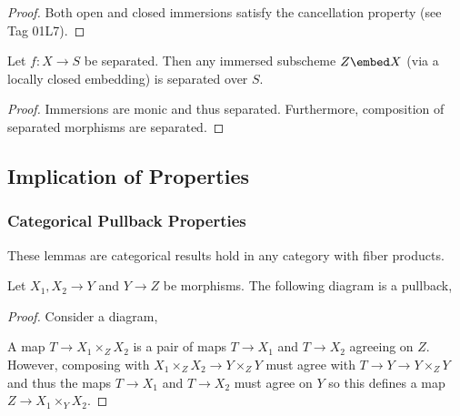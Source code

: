 \documentclass[12pt]{article}
\begin{document}
\begin{proof}
Both open and closed immersions satisfy the cancellation property (see Tag 01L7).
\end{proof}

\begin{prop}
Let $f : X \to S$ be separated. Then any immersed subscheme $Z \embed X$ (via a locally closed embedding) is separated over $S$.
\end{prop}

\begin{proof}
Immersions are monic and thus separated. Furthermore, composition of separated morphisms are separated. 
\end{proof}

\subsection{Implication of Properties}

\subsubsection{Categorical Pullback Properties}

\begin{rmk}
These lemmas are categorical results hold in any category with fiber products.
\end{rmk}

\begin{lemma}
Let $X_1, X_2 \to Y$ and $Y \to Z$ be morphisms. The following diagram is a pullback,
\begin{center}
\end{center}
\end{lemma}

\begin{proof}
Consider a diagram,
\begin{center}
\end{center}
A map $T \to X_1 \times_Z X_2$ is a pair of maps $T \to X_1$ and $T \to X_2$ agreeing on $Z$. However, composing with $X_1 \times_Z X_2 \to Y \times_Z Y$ must agree with $T \to Y \to Y \times_Z Y$ and thus the maps $T \to X_1$ and $T \to X_2$ must agree on $Y$ so this defines a map $Z \to X_1 \times_Y X_2$. 
\end{proof}
\end{document}
